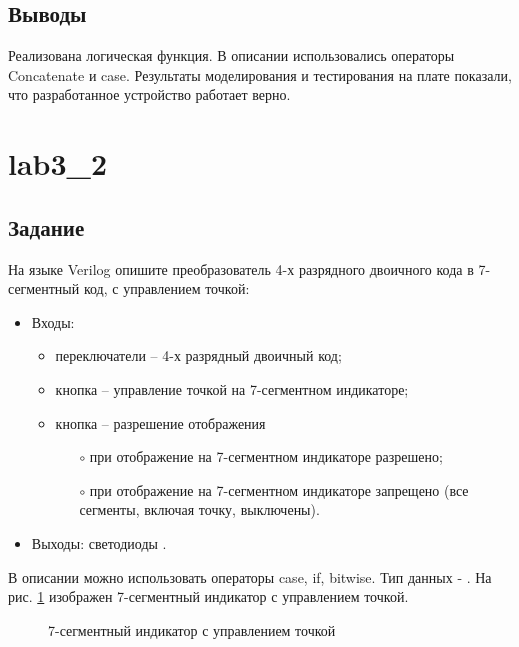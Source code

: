 \subsection{Выводы}

Реализована логическая функция. В описании использовались операторы Concatenate и case. Результаты моделирования и тестирования на плате показали, что разработанное устройство работает верно.

\newpage

\section{lab3\_2}

\subsection{Задание}

На языке Verilog опишите преобразователь 4-х разрядного двоичного кода в 7-сегментный код, с управлением точкой:
\begin{itemize}
	\item Входы:
		\begin{itemize}
			\item переключатели  -- 4-х разрядный двоичный код;
			\item кнопка  -- управление точкой на 7-сегментном индикаторе;
			\item кнопка  -- разрешение отображения
				\begin{itemize}
					\item[$\circ$] при  отображение на 7-сегментном индикаторе разрешено;
					\item[$\circ$] при  отображение на 7-сегментном индикаторе запрещено (все сегменты, включая точку, выключены).
				\end{itemize}
		\end{itemize}		
	\item Выходы: светодиоды .
\end{itemize}

В описании можно использовать операторы case, if, bitwise. Тип данных - . На рис. \ref{fig:lab3_2_segment} изображен 7-сегментный индикатор с управлением точкой.

\begin{figure}[H]
\begin{center}
	\caption{7-сегментный индикатор с управлением точкой}
	\label{fig:lab3_2_segment}
\end{center}
\end{figure}

